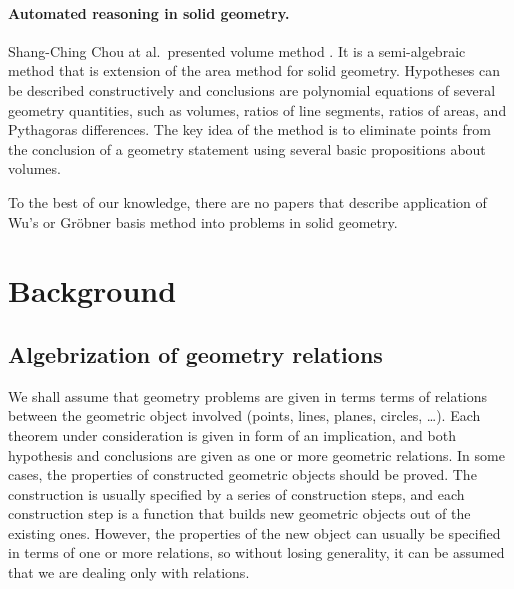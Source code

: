 \documentclass{aicom2e}
\begin{document}
\paragraph{Automated reasoning in solid geometry.}
Shang-Ching Chou at al.~presented volume method \cite{volumemethod}.
It is a semi-algebraic method that is extension of the area method for
solid geometry. Hypotheses can be described constructively and
conclusions are polynomial equations of several geometry quantities,
such as volumes, ratios of line segments, ratios of areas, and
Pythagoras differences. The key idea of the method is to eliminate
points from the conclusion of a geometry statement using several basic
propositions about volumes.


To the best of our knowledge, there are no papers that describe
application of Wu's or Gr\"obner basis method into problems in solid
geometry.


\section{Background}
\subsection{Algebrization of geometry relations}
We shall assume that geometry problems are given in terms terms of
relations between the geometric object involved (points, lines,
planes, circles, \ldots). Each theorem under consideration is given in
form of an implication, and both hypothesis and conclusions are given
as one or more geometric relations. In some cases, the properties of
constructed geometric objects should be proved. The construction is
usually specified by a series of construction steps, and each
construction step is a function that builds new geometric objects out
of the existing ones. However, the properties of the new object can
usually be specified in terms of one or more relations, so without
losing generality, it can be assumed that we are dealing only with
relations.
\end{document}
